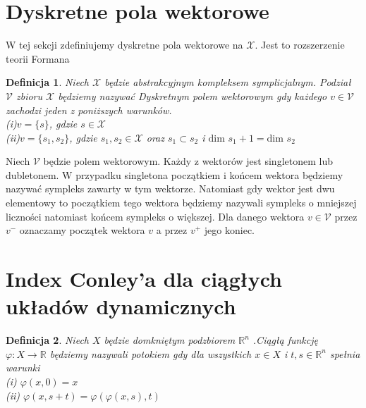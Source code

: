 \documentclass[12pt,a4paper]{article}
\newcommand{\symcom}[1]{\mathcal{#1}}
\newcommand{\dims}[1]{\text{dim }#1}
\newcommand{\fun}[3]{#1:#2 \rightarrow #3}
\newcommand{\Rn}[0]{\mathbb{R}^n}
\newcommand{\set}[1]{ \{#1\}}
\newtheorem{definition}{Definicja}[section]
\begin{document}
\section{Dyskretne pola wektorowe}
\noindent
W tej sekcji zdefiniujemy dyskretne pola wektorowe na $\symcom{X}$. Jest to rozszerzenie teorii Formana
\begin{definition}
Niech $\symcom {X}$ będzie abstrakcyjnym kompleksem symplicjalnym. Podział $\symcom{V}$ zbioru $\symcom{X}$  będziemy nazywać Dyskretnym polem wektorowym gdy każdego $v\in\symcom{V}$ zachodzi jeden z poniższych warunków.
\\(i)$v=\set{s}$, gdzie $s\in\symcom{X}$
\\(ii)$v=\set{s_1,s_2}$,  gdzie $s_1,s_2\in\symcom{X}$ oraz $s_1\subset s_2$ i $\dims {s_1}  + 1 =\dims{s_2} $


\end{definition}
\noindent
Niech $\symcom{V}$ będzie polem wektorowym. Każdy z wektorów jest singletonem lub dubletonem. W przypadku singletona początkiem i końcem wektora będziemy nazywać sympleks zawarty w tym wektorze. Natomiast gdy wektor jest dwu elementowy to początkiem tego wektora będziemy nazywali sympleks o mniejszej liczności natomiast końcem sympleks o większej. Dla danego wektora $v\in\symcom V$ przez $v^-$ oznaczamy początek wektora $v$ a przez $v^+$ jego koniec. 

\section{Index Conley'a dla ciągłych układów dynamicznych}
\begin{definition}
Niech $X$ będzie domkniętym podzbiorem $\Rn$ .Ciągłą funkcję $\fun{\varphi}{X}{\mathbb{R}}$ będziemy nazywali potokiem gdy dla wszystkich $x\in X$ i $t,s\in \Rn$ spełnia warunki
\\(i) $\varphi(x,0)=x$
\\(ii) $\varphi(x,s+t)=\varphi(\varphi(x,s),t)$
\end{definition}
\end{document}
